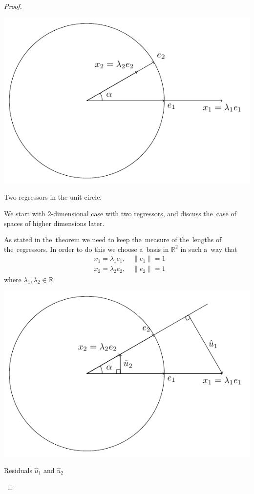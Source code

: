 \begin{proof}

\begin{marginfigure}[-2\baselineskip]
\includegraphics[scale=0.7]{figures/02_duality_original_regressors.pdf}
\caption{Two regressors in the unit circle.}
\end{marginfigure}

We start with $2$-dimensional case with two regressors,
and discuss the~case of spaces of higher dimensions later.

As stated in the~theorem we need to keep the~measure of the~lengths of the~regressors.
In order to do this we choose a~basis in $\mathbb{R}^2$ in such a~way that
\begin{align*}
&x_1 = \lambda_1 e_1, \quad \lVert e_1 \rVert = 1 \\
&x_2 = \lambda_2 e_2, \quad \lVert e_2 \rVert = 1
\end{align*}
where $\lambda_1, \lambda_2 \in \mathbb{R}$.

\begin{marginfigure}
\includegraphics[scale=0.7]{figures/02_duality_first_residuals.pdf}
\label{fig:duality_fst_residuals}
\caption{Residuals $\hat{u}_1$ and $\hat{u}_2$}
\end{marginfigure}


\end{proof}
